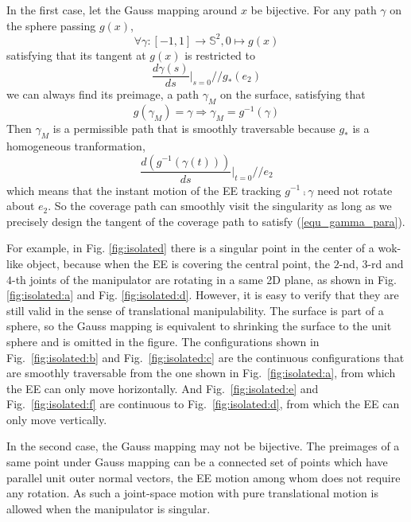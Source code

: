 \documentclass[Afour,sageh,times]{sagej}
\begin{document}
In the first case, let the Gauss mapping around $x$ be bijective.
For any path $\gamma$ on the sphere passing $g(x)$, 
\begin{equation}\label{equ_gamma}
\forall \gamma: [-1, 1]\rightarrow \mathbb{S}^2, 0\mapsto g(x)
\end{equation}
satisfying that its tangent at $g(x)$ is restricted to 
\begin{equation}\label{equ_gamma_direction}
\frac{d\gamma(s)}{ds}|_{s = 0} // g_*(e_2)
\end{equation}
we can always find its preimage, a path $\gamma_M$ on the surface, satisfying that 
\begin{equation}\label{equ_gammam}
g(\gamma_M) = \gamma\Rightarrow \gamma_M = g^{-1}(\gamma)
\end{equation} 
Then $\gamma_M$ is a permissible path that is smoothly traversable because $g_*$ is a homogeneous tranformation, 
\begin{equation}\label{equ_gamma_para}
\frac{d(g^{-1}(\gamma(t)))}{ds}|_{t = 0} // e_2
\end{equation}
which means that the instant motion of the EE tracking $g^{-1}\comp\gamma$ need not rotate about $e_2$. 
So the coverage path can smoothly visit the singularity as long as we precisely design the tangent of the coverage path to satisfy (\ref{equ_gamma_para}). 

For example, in Fig. \ref{fig:isolated} there is a singular point in the center of a wok-like object, because when the EE is covering the central point, the $2$-nd, $3$-rd and $4$-th joints of the manipulator are rotating in a same 2D plane, as shown in Fig. \ref{fig:isolated:a} and Fig. \ref{fig:isolated:d}. However, it is easy to verify that they are still valid in the sense of translational manipulability. 
The surface is part of a sphere, so the Gauss mapping is equivalent to shrinking the surface to the unit sphere and is omitted in the figure. 
The configurations shown in Fig.~\ref{fig:isolated:b} and Fig.~\ref{fig:isolated:c} are the continuous configurations that are smoothly traversable from the one shown in Fig.~\ref{fig:isolated:a}, from which the EE can only move horizontally. 
And Fig.~\ref{fig:isolated:e} and Fig.~\ref{fig:isolated:f} are continuous to Fig.~\ref{fig:isolated:d}, from which the EE can only move vertically. 

In the second case, the Gauss mapping may not be bijective. 
The preimages of a same point under Gauss mapping can be a connected set of points which have parallel unit outer normal vectors, the EE motion among whom does not require any rotation. 
As such a joint-space motion with pure translational motion is allowed when the manipulator is singular. 
\end{document}
